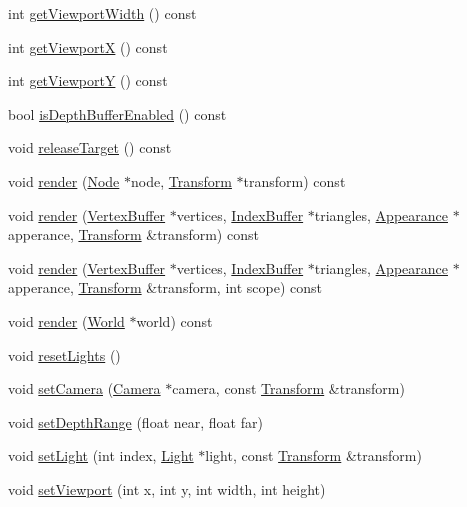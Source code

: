 \begin{CompactItemize}
\item 
int \hyperlink{classm3g_1_1Graphics3D_768e5c057e2fa4c4b17a67134abbf89f}{getViewportWidth} () const 
\item 
int \hyperlink{classm3g_1_1Graphics3D_af58b44cc6219f86c40dadb8a9377856}{getViewportX} () const 
\item 
int \hyperlink{classm3g_1_1Graphics3D_c21665afbf94a8f0153e099833c2b61a}{getViewportY} () const 
\item 
bool \hyperlink{classm3g_1_1Graphics3D_7f17c6781152840d42e756c27b0fb8c8}{isDepthBufferEnabled} () const 
\item 
void \hyperlink{classm3g_1_1Graphics3D_3ffaaf0d0f1e97a07c7f30c9b5a5dd32}{releaseTarget} () const 
\item 
void \hyperlink{classm3g_1_1Graphics3D_9c9ca78b3ce4cc358783a1a2701b9d85}{render} (\hyperlink{classm3g_1_1Node}{Node} $\ast$node, \hyperlink{classm3g_1_1Transform}{Transform} $\ast$transform) const 
\item 
void \hyperlink{classm3g_1_1Graphics3D_dc32291b31d6d3a32037eb9f727f73c0}{render} (\hyperlink{classm3g_1_1VertexBuffer}{VertexBuffer} $\ast$vertices, \hyperlink{classm3g_1_1IndexBuffer}{IndexBuffer} $\ast$triangles, \hyperlink{classm3g_1_1Appearance}{Appearance} $\ast$apperance, \hyperlink{classm3g_1_1Transform}{Transform} \&transform) const 
\item 
void \hyperlink{classm3g_1_1Graphics3D_9179d0d886a57cd3234b34f1b59dfc3c}{render} (\hyperlink{classm3g_1_1VertexBuffer}{VertexBuffer} $\ast$vertices, \hyperlink{classm3g_1_1IndexBuffer}{IndexBuffer} $\ast$triangles, \hyperlink{classm3g_1_1Appearance}{Appearance} $\ast$apperance, \hyperlink{classm3g_1_1Transform}{Transform} \&transform, int scope) const 
\item 
void \hyperlink{classm3g_1_1Graphics3D_8ef004c92d601203b8c697d441e7713f}{render} (\hyperlink{classm3g_1_1World}{World} $\ast$world) const 
\item 
void \hyperlink{classm3g_1_1Graphics3D_b8821ec231e8ebd939ae0feaaf138542}{resetLights} ()
\item 
void \hyperlink{classm3g_1_1Graphics3D_0df7bb61cfeba6626e20fd07ddd1c460}{setCamera} (\hyperlink{classm3g_1_1Camera}{Camera} $\ast$camera, const \hyperlink{classm3g_1_1Transform}{Transform} \&transform)
\item 
void \hyperlink{classm3g_1_1Graphics3D_6fc3837286f3516aa3320aeec9729495}{setDepthRange} (float near, float far)
\item 
void \hyperlink{classm3g_1_1Graphics3D_2bf83cb69f50117dd9d5548fe96d0ab0}{setLight} (int index, \hyperlink{classm3g_1_1Light}{Light} $\ast$light, const \hyperlink{classm3g_1_1Transform}{Transform} \&transform)
\item 
void \hyperlink{classm3g_1_1Graphics3D_0b4ec48e9c19060e9be5648c118c23b1}{setViewport} (int x, int y, int width, int height)
\end{CompactItemize}
